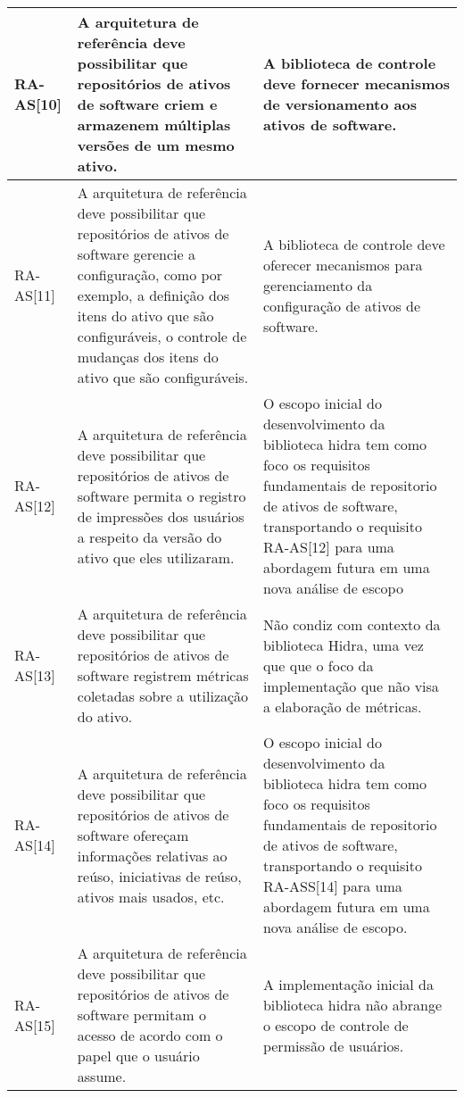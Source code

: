 \begin{longtable}{ | l | p{7cm} | p{7cm} |}
    RA-AS[10]
    & A arquitetura de referência deve possibilitar que  repositórios de ativos de software criem e armazenem  múltiplas versões de um mesmo ativo.
    & A biblioteca de controle deve fornecer mecanismos de versionamento aos ativos de software. \\ \hline
    
    RA-AS[11] 
    & A arquitetura de referência deve possibilitar que  repositórios de ativos de software gerencie a  configuração, como por exemplo, a definição dos itens  do ativo que são configuráveis, o controle de  mudanças dos itens do ativo que são configuráveis.
    & A biblioteca de controle deve oferecer mecanismos  para  gerenciamento da configuração de ativos de software.  \\ \hline
    
    RA-AS[12] 
    &A arquitetura de referência deve possibilitar que  repositórios de ativos de software permita o registro de  impressões dos usuários a respeito da versão do ativo  que eles utilizaram. 
    & O escopo inicial do desenvolvimento da biblioteca hidra tem como foco os requisitos fundamentais de repositorio de ativos de software, transportando o requisito RA-AS[12] para uma abordagem futura em uma nova análise de escopo \\ \hline
    RA-AS[13] 
    & A arquitetura de referência deve possibilitar que  repositórios de ativos de software registrem métricas  coletadas sobre a utilização do ativo.
    & Não condiz com contexto da biblioteca Hidra, uma vez que que o foco da implementação que não visa
a elaboração de métricas. \\ \hline
    RA-AS[14] 
    & A arquitetura de referência deve possibilitar que  repositórios de ativos de software ofereçam  informações relativas ao reúso, iniciativas de reúso,  ativos mais usados, etc.
    & O escopo inicial do desenvolvimento da biblioteca hidra tem como foco os requisitos fundamentais de repositorio de ativos de software, transportando o requisito RA-ASS[14] para uma abordagem futura em uma nova análise de escopo. \\ \hline
    
    RA-AS[15] 
    & A arquitetura de referência deve possibilitar que  repositórios de ativos de software permitam o acesso de  acordo com o papel que o usuário assume.
    & A implementação inicial da biblioteca hidra não abrange o escopo de controle de permissão de usuários. \\ \hline
    

\end{longtable}
